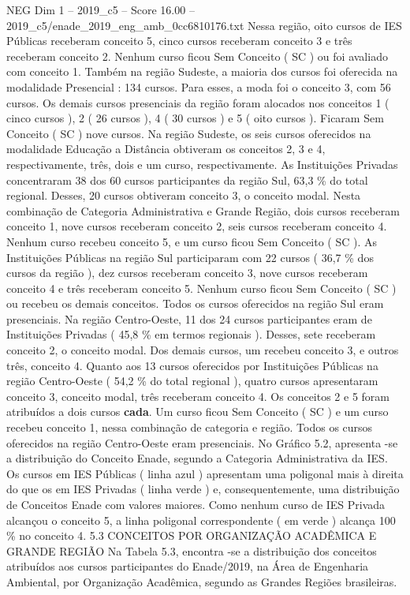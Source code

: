 \begin{textsample}{NEG Dim 1 – 2019\_c5 – Score 16.00 – 2019\_c5/enade\_2019\_eng\_amb\_0cc6810176.txt}
Nessa região, oito cursos de IES Públicas receberam conceito 5, cinco cursos receberam conceito 3 e três receberam conceito 2.
Nenhum curso ficou Sem Conceito ( SC ) ou foi avaliado com conceito 1.
Também na região Sudeste, a maioria dos cursos foi oferecida na modalidade Presencial : 134 cursos.
Para esses, a moda foi o conceito 3, com 56 cursos.
Os demais cursos presenciais da região foram alocados nos conceitos 1 ( cinco cursos ), 2 ( 26 cursos ), 4 ( 30 cursos ) e 5 ( oito cursos ).
Ficaram Sem Conceito ( SC ) nove cursos.
Na região Sudeste, os seis cursos oferecidos na modalidade Educação a Distância obtiveram os conceitos 2, 3 e 4, respectivamente, três, dois e um curso, respectivamente.
As Instituições Privadas concentraram 38 dos 60 cursos participantes da região Sul, 63,3 \% do total regional.
Desses, 20 cursos obtiveram conceito 3, o conceito modal.
Nesta combinação de Categoria Administrativa e Grande Região, dois cursos receberam conceito 1, nove cursos receberam conceito 2, seis cursos receberam conceito 4.
Nenhum curso recebeu conceito 5, e um curso ficou Sem Conceito ( SC ).
As Instituições Públicas na região Sul participaram com 22 cursos ( 36,7 \% dos cursos da região ), dez cursos receberam conceito 3, nove cursos receberam conceito 4 e três receberam conceito 5.
Nenhum curso ficou Sem Conceito ( SC ) ou recebeu os demais conceitos.
Todos os cursos oferecidos na região Sul eram presenciais.
Na região Centro-Oeste, 11 dos 24 cursos participantes eram de Instituições Privadas ( 45,8 \% em termos regionais ).
Desses, sete receberam conceito 2, o conceito modal.
Dos demais cursos, um recebeu conceito 3, e outros três, conceito 4.
Quanto aos 13 cursos oferecidos por Instituições Públicas na região Centro-Oeste ( 54,2 \% do total regional ), quatro cursos apresentaram conceito 3, conceito modal, três receberam conceito 4.
Os conceitos 2 e 5 foram atribuídos a dois cursos \textbf{cada}.
Um curso ficou Sem Conceito ( SC ) e um curso recebeu conceito 1, nessa combinação de categoria e região.
Todos os cursos oferecidos na região Centro-Oeste eram presenciais.
No Gráfico 5.2, apresenta -se a distribuição do Conceito Enade, segundo a Categoria Administrativa da IES.
Os cursos em IES Públicas ( linha azul ) apresentam uma poligonal mais à direita do que os em IES Privadas ( linha verde ) e, consequentemente, uma distribuição de Conceitos Enade com valores maiores.
Como nenhum curso de IES Privada alcançou o conceito 5, a linha poligonal correspondente ( em verde ) alcança 100 \% no conceito 4. 5.3 CONCEITOS POR ORGANIZAÇÃO ACADÊMICA E GRANDE REGIÃO Na Tabela 5.3, encontra -se a distribuição dos conceitos atribuídos aos cursos participantes do Enade/2019, na Área de Engenharia Ambiental, por Organização Acadêmica, segundo as Grandes Regiões brasileiras.

\end{textsample}
